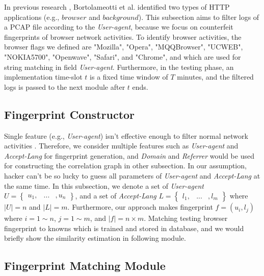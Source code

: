 In previous research \cite{bortolameotti2017decanter}, Bortolameotti et al. identified two types of HTTP applications (e.g., $browser$ and $background$). This subsection aims to filter logs of a PCAP file according to the {\em User-agent}, because we focus on counterfeit fingerprints of browser network activities. To identify browser activities, the browser flags we defined are "Mozilla", "Opera", "MQQBrowser", "UCWEB",  "NOKIA5700", "Openwave", "Safari", and "Chrome", and which are used for string matching in field {\em User-agent}. Furthermore, in the testing phase, an implementation time-slot $t$ is a fixed time window of $T$ minutes, and the filtered logs is passed to the next module after $t$ ends.


\subsection{Fingerprint Constructor}

Single feature (e.g., {\em User-agent}) isn't effective enough to filter normal network activities \cite{bortolameotti2017decanter} \cite{kheir2013analyzing}. Therefore, we consider multiple features such as {\em User-agent} and {\em Accept-Lang} for fingerprint generation, and {\em Domain} and {\em Referrer} would be used for constructing the correlation graph in other subsection. In our assumption, hacker can't be so lucky to guess all parameters of {\em User-agent} and {\em Accept-Lang} at the same time. In this subsection, we denote a set of {\em User-agent} $U = \begin{Bmatrix} u_{1}, & ... & , u_{n} \end{Bmatrix}$, and a set of {\em Accept-Lang} $L = \begin{Bmatrix} l_{1}, & ... & , l_{m} \end{Bmatrix}$ where $\left | U \right | = n$ and $\left | L  \right | = m$. Furthermore, our approach makes fingerprint $f = (u_{i}, l_{j})$ where $i = 1 \sim n$, $j = 1 \sim m$, and $\left | f \right | = n \times m $. Matching testing browser fingerprint to knowns which is trained and stored in database, and we would briefly show the similarity estimation in following module.

\subsection{Fingerprint Matching Module}

